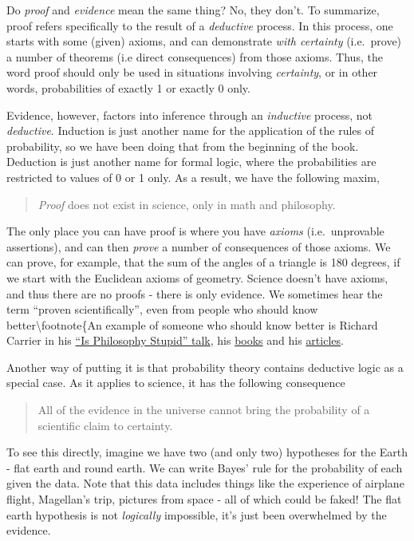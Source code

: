 \documentclass{tufte-book}
\begin{document}
Do \emph{proof} and \emph{evidence} mean the same thing? No, they don't.
To summarize, proof refers specifically to the result of a
\emph{deductive} process. In this process, one starts with some (given)
axioms, and can demonstrate \emph{with certainty} (i.e.~prove) a number
of theorems (i.e direct consequences) from those axioms. Thus, the word
proof should only be used in situations involving \emph{certainty}, or
in other words, probabilities of exactly 1 or exactly 0 only.

Evidence, however, factors into inference through an \emph{inductive}
process, not \emph{deductive}. Induction is just another name for the
application of the rules of probability, so we have been doing that from
the beginning of the book. Deduction is just another name for formal
logic, where the probabilities are restricted to values of 0 or 1 only.
As a result, we have the following maxim,

\begin{quote}
\emph{Proof} does not exist in science, only in math and philosophy.
\end{quote}

The only place you can have proof is where you have \emph{axioms}
(i.e.~unprovable assertions), and can then \emph{prove} a number of
consequences of those axioms. We can prove, for example, that the sum of
the angles of a triangle is 180 degrees, if we start with the Euclidean
axioms of geometry. Science doesn't have axioms, and thus there are no
proofs - there is only evidence. We sometimes hear the term ``proven
scientifically'', even from people who should know
better\textbackslash{}footnote\{An example of someone who should know
better is Richard Carrier in his
\href{http://www.youtube.com/watch?v=YLvWz9GQ3PQ}{``Is Philosophy
Stupid'' talk}, his
\href{http://www.amazon.com/Proving-History-Bayess-Theorem-Historical/dp/1616145595}{books}
and his
\href{http://infidels.org/library/modern/richard_carrier/theory.html}{articles}.

Another way of putting it is that probability theory contains deductive
logic as a special case. As it applies to science, it has the following
consequence

\begin{quote}
All of the evidence in the universe cannot bring the probability of a
scientific claim to certainty.
\end{quote}

To see this directly, imagine we have two (and only two) hypotheses for
the Earth - flat earth and round earth. We can write Bayes' rule for the
probability of each given the data. Note that this data includes things
like the experience of airplane flight, Magellan's trip, pictures from
space - all of which could be faked! The flat earth hypothesis is not
\emph{logically} impossible, it's just been overwhelmed by the evidence.
\end{document}
